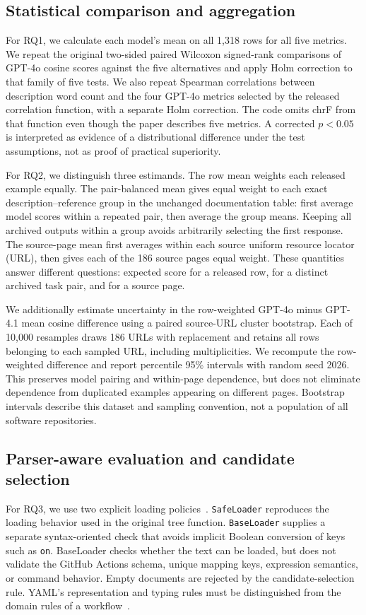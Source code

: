 \subsection{Statistical comparison and aggregation}
For RQ1, we calculate each model's mean on all 1,318 rows for all five metrics. We repeat the original two-sided paired Wilcoxon signed-rank comparisons of GPT-4o cosine scores against the five alternatives and apply Holm correction to that family of five tests. We also repeat Spearman correlations between description word count and the four GPT-4o metrics selected by the released correlation function, with a separate Holm correction. The code omits chrF from that function even though the paper describes five metrics. A corrected $p<0.05$ is interpreted as evidence of a distributional difference under the test assumptions, not as proof of practical superiority.

For RQ2, we distinguish three estimands. The row mean weights each released example equally. The pair-balanced mean gives equal weight to each exact description--reference group in the unchanged documentation table: first average model scores within a repeated pair, then average the group means. Keeping all archived outputs within a group avoids arbitrarily selecting the first response. The source-page mean first averages within each source uniform resource locator (URL), then gives each of the 186 source pages equal weight. These quantities answer different questions: expected score for a released row, for a distinct archived task pair, and for a source page.

We additionally estimate uncertainty in the row-weighted GPT-4o minus GPT-4.1 mean cosine difference using a paired source-URL cluster bootstrap. Each of 10,000 resamples draws 186 URLs with replacement and retains all rows belonging to each sampled URL, including multiplicities. We recompute the row-weighted difference and report percentile 95\% intervals with random seed 2026. This preserves model pairing and within-page dependence, but does not eliminate dependence from duplicated examples appearing on different pages. Bootstrap intervals describe this dataset and sampling convention, not a population of all software repositories.

\subsection{Parser-aware evaluation and candidate selection}
For RQ3, we use two explicit loading policies~\cite{pyyaml}. \texttt{SafeLoader} reproduces the loading behavior used in the original tree function. \texttt{BaseLoader} supplies a separate syntax-oriented check that avoids implicit Boolean conversion of keys such as \texttt{on}. BaseLoader checks whether the text can be loaded, but does not validate the GitHub Actions schema, unique mapping keys, expression semantics, or command behavior. Empty documents are rejected by the candidate-selection rule. YAML's representation and typing rules must be distinguished from the domain rules of a workflow~\cite{yaml}.

